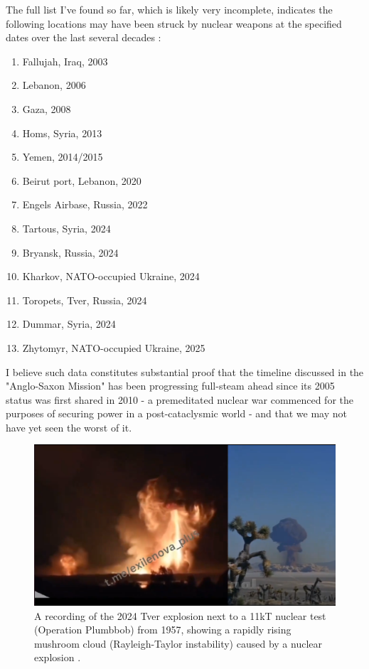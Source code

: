 \documentclass[10pt,twocolumn,letterpaper]{article}
\begin{document}
The full list I've found so far, which is likely very incomplete, indicates the following locations may have been struck by nuclear weapons at the specified dates over the last several decades \cite{24}:

\begin{flushleft}
\begin{enumerate}
    \item Fallujah, Iraq, 2003
    \item Lebanon, 2006
    \item Gaza, 2008
    \item Homs, Syria, 2013
    \item Yemen, 2014/2015
    \item Beirut port, Lebanon, 2020
    \item Engels Airbase, Russia, 2022
    \item Tartous, Syria, 2024
    \item Bryansk, Russia, 2024
    \item Kharkov, NATO-occupied Ukraine, 2024
    \item Toropets, Tver, Russia, 2024
    \item Dummar, Syria, 2024
    \item Zhytomyr, NATO-occupied Ukraine, 2025
\end{enumerate}
\end{flushleft}

I believe such data constitutes substantial proof that the timeline discussed in the "Anglo-Saxon Mission" has been progressing full-steam ahead since its 2005 status was first shared in 2010 - a premeditated nuclear war commenced for the purposes of securing power in a post-cataclysmic world - and that we may not have yet seen the worst of it.

\begin{figure}[t]
\begin{center}
\includegraphics[width=1\textwidth]{tver.png}
\end{center}
   \caption{A recording of the 2024 Tver explosion next to a 11kT nuclear test (Operation Plumbbob) from 1957, showing a rapidly rising mushroom cloud (Rayleigh-Taylor instability) caused by a nuclear explosion \cite{24}.}
   \label{fig:12}
\end{figure}
\end{document}
